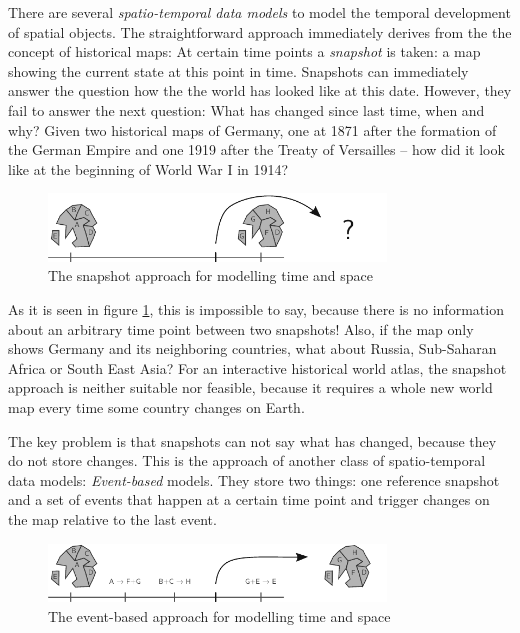 There are several \emph{spatio-temporal data models} to model the temporal development of spatial objects. The straightforward approach immediately derives from the the concept of historical maps: At certain time points a \emph{snapshot} is taken: a map showing the current state at this point in time. Snapshots can immediately answer the question how the the world has looked like at this date. However, they fail to answer the next question: What has changed since last time, when and why? Given two historical maps of Germany, one at 1871 after the formation of the German Empire and one 1919 after the Treaty of Versailles -- how did it look like at the beginning of World War I in 1914?

\begin{figure}[H]
  \centering
  \includegraphics[width=0.8\textwidth]{graphics/introduction/snapshot_approach}
  \caption{The snapshot approach for modelling time and space}
  \label{fig:snapshot_approach}
\end{figure}

As it is seen in figure \ref{fig:snapshot_approach}, this is impossible to say, because there is no information about an arbitrary time point between two snapshots! Also, if the map only shows Germany and its neighboring countries, what about Russia, Sub-Saharan Africa or South East Asia? For an interactive historical world atlas, the snapshot approach is neither suitable nor feasible, because it requires a whole new world map every time some country changes on Earth.

The key problem is that snapshots can not say what has changed, because they do not store changes. This is the approach of another class of spatio-temporal data models: \emph{Event-based} models. They store two things: one reference snapshot and a set of events that happen at a certain time point and trigger changes on the map relative to the last event.

\begin{figure}[H]
  \centering
  \includegraphics[width=0.8\textwidth]{graphics/introduction/event_based_approach}
  \caption{The event-based approach for modelling time and space}
  \label{fig:event_based_approach}
\end{figure}


